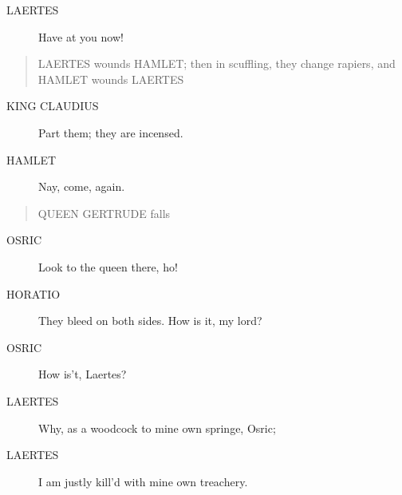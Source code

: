 \documentclass{article}
\begin{document}
\begin{description}
            
\item[LAERTES] Have at you now!
\end{description}
          
\begin{quote}
LAERTES wounds HAMLET; then in scuffling, they
change rapiers, and HAMLET wounds LAERTES
\end{quote}
          
\begin{description}
            
\item[KING CLAUDIUS] Part them; they are incensed.
\end{description}
          
\begin{description}
            
\item[HAMLET] Nay, come, again.
\end{description}
          
\begin{quote}
QUEEN GERTRUDE falls
\end{quote}
          
\begin{description}
            
\item[OSRIC] Look to the queen there, ho!
\end{description}
          
\begin{description}
            
\item[HORATIO] They bleed on both sides. How is it, my lord?
\end{description}
          
\begin{description}
            
\item[OSRIC] How is't, Laertes?
\end{description}
          
\begin{description}
            
\item[LAERTES] Why, as a woodcock to mine own springe, Osric;
\item[LAERTES] I am justly kill'd with mine own treachery.
\end{description}
          
\end{document}
